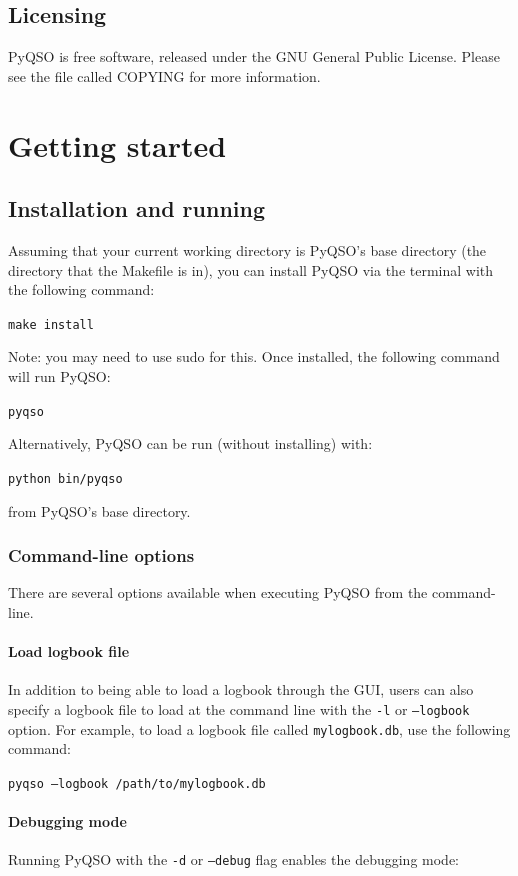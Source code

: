 \documentclass[11pt, a4paper]{report}
\begin{document}
\section{Licensing}
PyQSO is free software, released under the GNU General Public License. Please see the file called COPYING for more information.


\chapter{Getting started}\label{chap:getting_started}

\section{Installation and running}
Assuming that your current working directory is PyQSO's base directory (the directory that the Makefile is in), you can install PyQSO via the terminal with the following command:

  \texttt{make install}

\noindent Note: you may need to use sudo for this. Once installed, the following command will run PyQSO:

  \texttt{pyqso}

\noindent Alternatively, PyQSO can be run (without installing) with:

  \texttt{python bin/pyqso}

\noindent from PyQSO's base directory.

\subsection{Command-line options}
There are several options available when executing PyQSO from the command-line.

\subsubsection{Load logbook file}
In addition to being able to load a logbook through the GUI, users can also specify a logbook file to load at the command line with the \texttt{-l} or \texttt{--logbook} option. For example, to load a logbook file called \texttt{mylogbook.db}, use the following command:

  \texttt{pyqso --logbook /path/to/mylogbook.db}

\subsubsection{Debugging mode}
Running PyQSO with the \texttt{-d} or \texttt{--debug} flag enables the debugging mode:
\end{document}

